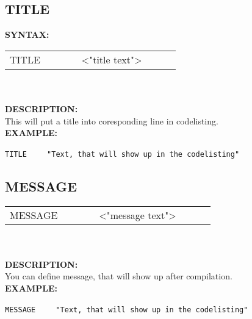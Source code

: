 {                \subsection{TITLE}
                \textbf{SYNTAX:}\\
                 {
                    \texttt{}
                    \begin{tabular}[h!]{llll}
                        { \color{highlight_directive} TITLE }\verb`       `{ \color{highlight_string} <"title text"> }
                    \end{tabular}
                    }\\
                    \\
                \textbf{DESCRIPTION:}\\
                This will put a title into coresponding line in codelisting.  \\
                \textbf{EXAMPLE:}\\
                        \begin{code}[h!]
                            {\color{highlight_directive}\verb'TITLE'}\verb'    '
                            {\color{highlight_constant}\verb'"Text, that will show up in the codelisting"'}
                        \end{code}

                \subsection{MESSAGE}
                 {
                    \texttt{}
                    \begin{tabular}[h!]{llll}
                        { \color{highlight_directive} MESSAGE }\verb`       `{ \color{highlight_string} <"message text"> }
                    \end{tabular}
                    }\\
                    \\
                \textbf{DESCRIPTION:}\\
                You can define message, that will show up after compilation.  \\
                \textbf{EXAMPLE:}\\
                        \begin{code}[h!]
                            {\color{highlight_directive}\verb'MESSAGE'}\verb'    '
                            {\color{highlight_constant}\verb'"Text, that will show up in the codelisting"'}
                        \end{code}

}
